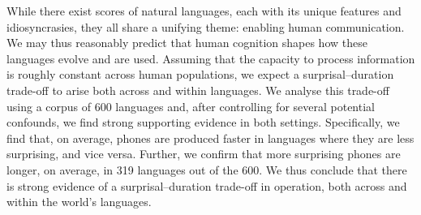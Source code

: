 While there exist scores of natural languages, each with its unique features and idiosyncrasies, they all share a unifying theme: enabling human communication. We may thus reasonably predict that human cognition shapes how these languages evolve and are used. Assuming that the capacity to process information is roughly constant across human populations, we expect a surprisal--duration trade-off to arise both across and within languages. We analyse this trade-off using a corpus of 600 languages and, after controlling for several potential confounds, we find strong supporting evidence in both settings. Specifically, we find that, on average, phones are produced faster in languages where they are less surprising, and vice versa. Further, we confirm that more surprising phones are longer, on average, in 319 languages out of the 600. We thus conclude that there is strong evidence of a surprisal--duration trade-off in operation, both across and within the world's languages.
